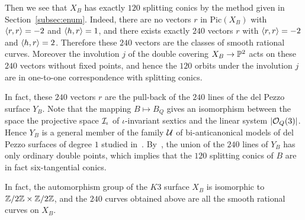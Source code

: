 \documentclass{amsart} %
\newcommand{\ps}{B}
\newcommand{\Pic}{\mathrm{Pic}}
\begin{document}
%
\par
%
Then we see that $X_{\ps}$ has exactly $120$ splitting conics 
by the method given in Section~\ref{subsec:enum}.
Indeed, there are no vectors $r$ in $\Pic(X_{\ps})$ 
with $\langle r, r \rangle=-2$ and $\langle h, r \rangle=1$,
and there exists exactly $240$ vectors $r$ 
with  $\langle r, r \rangle=-2$ and $\langle h, r \rangle=2$.
Therefore these $240$ vectors  are the classes of smooth rational curves.
Moreover the involution $j$ of the double covering $X_{\ps}\to \PP^2$
acts on these $240$ vectors without fixed points,
and hence the $120$ orbits  
under the  involution $j$ are in one-to-one correspondence with
splitting conics.
%
\par
%
In fact, these $240$ vectors $r$ are the pull-back of the $240$ lines 
of the del Pezzo surface $Y_{\ps}$.
Note that the mapping $\ps\mapsto \ps_Q$ 
gives an isomorphism between the space 
the projective space $\mathord{\mathcal{I}}_{\iota}$ 
of $\iota$-invariant sextics
and the linear system  $|\mathord{\mathcal{O}}_{Q}(3)|$.
Hence $Y_{\ps}$ is a general member of the family $\mathord{\mathcal{U}}$
of bi-anticanonical models of del Pezzo surfaces of degree $1$ 
studied in~\cite{ShimadaTurk}.
By~\cite[Proposition 4.4]{ShimadaTurk},
the union of  the $240$ lines 
of $Y_{\ps}$ has only ordinary double points,
which implies that the $120$ splitting conics of $\ps$ are 
in fact  six-tangential conics.
%
\begin{remark}
In fact, the automorphism group
of the $K3$ surface $X_{\ps}$  is isomorphic to $\mathord{\mathbb{Z}}/2\mathord{\mathbb{Z}}\times \mathord{\mathbb{Z}}/2\mathord{\mathbb{Z}}$,
and 
the  $240$  curves obtained above are all the smooth rational curves on $X_{\ps}$.

\end{remark}
%
\end{document}
